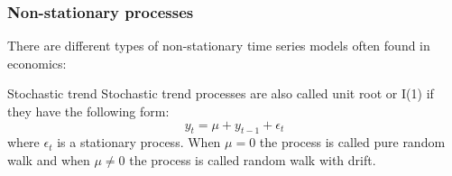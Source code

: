 \documentclass{beamer}
\begin{document}
\begin{frame}
\frametitle{Non-stationary processes}
There are different types of non-stationary time series models often found in economics:
\begin{block}{Stochastic trend}
Stochastic trend processes are also called {\color{red}unit root or I(1)} if they have the following form:
{\color{blue}
\[
y_t = \mu + y_{t-1} + \epsilon_t
\]}
\noindent where $\epsilon_t$ is a stationary process. When $\mu = 0 $ the process is called pure random walk and when $\mu \neq 0$  the process is called random walk with drift.
\end{block}
\end{frame}
\end{document}
